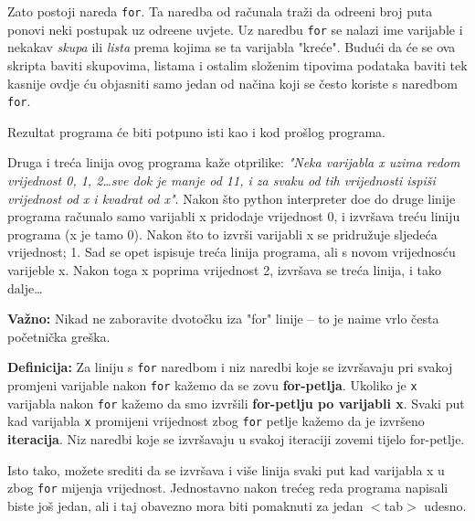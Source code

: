 Zato postoji nareda \verb"for". Ta naredba od ra\v{c}unala tra\v{z}i da
odre\dj{}eni broj puta ponovi neki postupak uz odre\dj{}ene uvjete. Uz
naredbu \verb"for" se nalazi ime varijable i nekakav \emph{skupa}
ili \emph{lista} prema kojima se ta varijabla "kre\'{c}e". Budu\'{c}i da
\'{c}e se ova skripta baviti skupovima, listama i ostalim slo\v{z}enim
tipovima podataka baviti tek kasnije ovdje \'{c}u objasniti samo jedan
od na\v{c}ina koji se \v{c}esto koriste s naredbom \verb"for".


Rezultat programa \'{c}e biti potpuno isti kao i kod pro\v{s}log programa.

Druga i tre\'{c}a linija ovog programa ka\v{z}e otprilike: \emph{"Neka
varijabla x uzima redom vrijednost 0, 1, 2\dots sve dok je manje
od 11, i za svaku od tih vrijednosti ispi\v{s}i vrijednost od x i
kvadrat od x"}. Nakon \v{s}to python interpreter do\dj{}e do druge linije
programa ra\v{c}unalo samo varijabli x pridodaje vrijednost 0, i
izvr\v{s}ava tre\'{c}u liniju programa (x je tamo 0). Nakon \v{s}to to
izvr\v{s}i varijabli x se pridru\v{z}uje sljede\'{c}a vrijednost; 1. Sad se
opet ispisuje tre\'{c}a linija programa, ali s novom vrijednos\'{c}u
varijeble x. Nakon toga x poprima vrijednost 2, izvr\v{s}ava se tre\'{c}a
linija, i tako dalje\dots

\textbf{Va\v{z}no:}
Nikad ne zaboravite dvoto\v{c}ku iza "for" linije -- to je naime vrlo
\v{c}esta po\v{c}etni\v{c}ka gre\v{s}ka.

\textbf{Definicija:} Za liniju s \verb"for" naredbom i niz naredbi koje
se izvr\v{s}avaju pri svakoj promjeni varijable nakon \verb"for"
ka\v{z}emo da se zovu \textbf{for-petlja}. Ukoliko je \verb"x" varijabla
nakon \verb"for" ka\v{z}emo da smo izvr\v{s}ili \textbf{for-petlju po varijabli
x}. Svaki put kad varijabla \verb"x" promijeni vrijednost zbog \verb"for"
petlje ka\v{z}emo da je izvr\v{s}eno \textbf{iteracija}. Niz naredbi koje se
izvr\v{s}avaju u svakoj iteraciji zovemi tijelo for-petlje.

Isto tako, mo\v{z}ete srediti da se izvr\v{s}ava i vi\v{s}e linija svaki
put kad varijabla x u zbog \verb"for" mijenja vrijednost. Jednostavno
nakon tre\'{c}eg reda programa napisali biste jo\v{s} jedan, ali i taj
obavezno mora biti pomaknuti za jedan $<$tab$>$ udesno.

